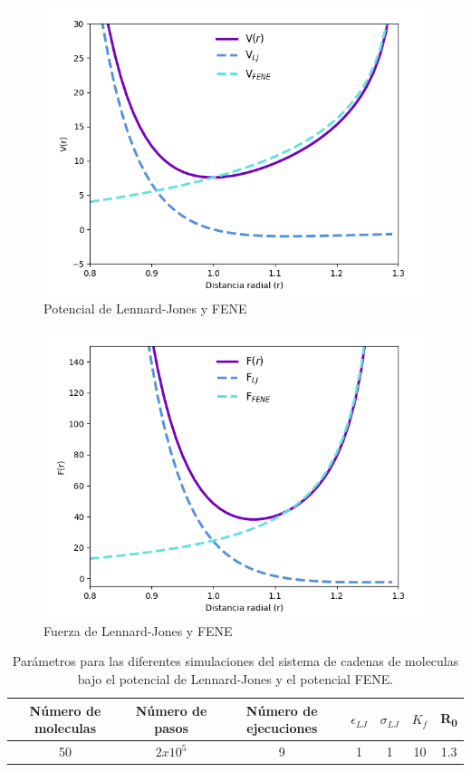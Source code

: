 \begin{figure}[H]
    \centering
    \includegraphics[scale=0.42]{../Graphics/potential.png}
    \caption{Potencial de Lennard-Jones y FENE}
    \label{fig:pot-len-jones}
\end{figure}
\begin{figure}[H]
    \centering
    \includegraphics[scale=0.42]{../Graphics/force.png}
    \caption{Fuerza de Lennard-Jones y FENE}
    \label{fig:force-len-jones}
\end{figure}
\begin{table}
    \centering
    \begin{tabular}{ccccccc}
        \hline
        Número de moleculas & Número de pasos& Número de ejecuciones &$\epsilon_{LJ}$ & $\sigma_{LJ} $ & $K_f$  & R\textsubscript{0} \\ \hline
        \multirow{2}{*}{50} & \multirow{2}{*}{$2x10^{5}$}&\multirow{2}{*}{9}&\multirow{2}{*}{1} &\multirow{2}{*}{1}  &\multirow{2}{*}{10}   & \multirow{2}{*}{1.3}\\
          & & & & & \\ \hline
    \end{tabular}
    \caption{Parámetros para las diferentes simulaciones del sistema de cadenas de moleculas bajo el potencial de Lennard-Jones y el potencial FENE.}
    \label{table:parametros}
\end{table}
